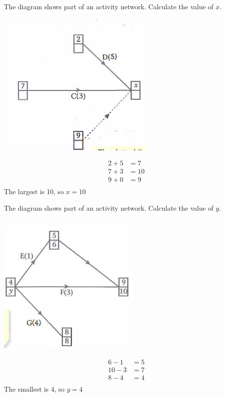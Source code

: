 \documentclass[a4paper]{article}
\begin{document}
\begin{eg}
\begin{center}
	\end{center}
\end{eg}

\newpage
\begin{eg}
	The diagram shows part of an activity network. Calculate the value of $x$.
	\begin{center}
		\includegraphics[scale=0.5]{img_D/5_5}
	\end{center}
	\begin{align*}
		2+5 & =7  \\
		7+3 & =10 \\
		9+0 & =9  \\
	\end{align*}
	The largest is 10, so $x=10$
\end{eg}

\begin{eg}
	The diagram shows part of an activity network. Calculate the value of $y$.
	\begin{center}
		\includegraphics[scale=0.5]{img_D/5_6}
	\end{center}
	\begin{align*}
		6-1  & =5 \\
		10-3 & =7 \\
		8-4  & =4 \\
	\end{align*}
	The smallest is 4, so $y=4$
\end{eg}
\end{document}
